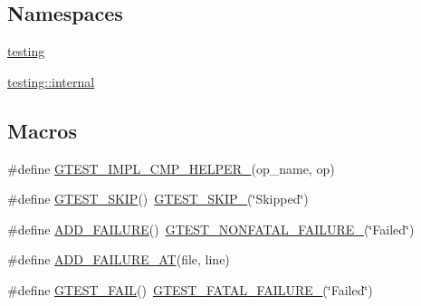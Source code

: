 \subsection*{Namespaces}
\begin{DoxyCompactItemize}
\item 
 \mbox{\hyperlink{namespacetesting}{testing}}
\item 
 \mbox{\hyperlink{namespacetesting_1_1internal}{testing\+::internal}}
\end{DoxyCompactItemize}
\subsection*{Macros}
\begin{DoxyCompactItemize}
\item 
\#define \mbox{\hyperlink{_obj__test_2lib_2googletest-master_2googletest_2include_2gtest_2gtest_8h_a4a5b6fbde5dd05e05dd6846ac5e5c18e}{G\+T\+E\+S\+T\+\_\+\+I\+M\+P\+L\+\_\+\+C\+M\+P\+\_\+\+H\+E\+L\+P\+E\+R\+\_\+}}(op\+\_\+name,  op)
\item 
\#define \mbox{\hyperlink{_obj__test_2lib_2googletest-master_2googletest_2include_2gtest_2gtest_8h_a3c0bbb980d533108ecc23c3534527d3c}{G\+T\+E\+S\+T\+\_\+\+S\+K\+IP}}()~\mbox{\hyperlink{_obj__test_2lib_2googletest-master_2googletest_2include_2gtest_2internal_2gtest-internal_8h_ab75ed7a6cd9e466944ce680c1c07ab47}{G\+T\+E\+S\+T\+\_\+\+S\+K\+I\+P\+\_\+}}(\char`\"{}Skipped\char`\"{})
\item 
\#define \mbox{\hyperlink{_obj__test_2lib_2googletest-master_2googletest_2include_2gtest_2gtest_8h_adc16b5b0a740c39084ea5c9e960e3063}{A\+D\+D\+\_\+\+F\+A\+I\+L\+U\+RE}}()~\mbox{\hyperlink{_obj__test_2lib_2googletest-release-1_88_81_2googletest_2include_2gtest_2internal_2gtest-internal_8h_a6cb7482cfa03661a91c698eb5895f642}{G\+T\+E\+S\+T\+\_\+\+N\+O\+N\+F\+A\+T\+A\+L\+\_\+\+F\+A\+I\+L\+U\+R\+E\+\_\+}}(\char`\"{}Failed\char`\"{})
\item 
\#define \mbox{\hyperlink{_obj__test_2lib_2googletest-master_2googletest_2include_2gtest_2gtest_8h_a448d7e5105b640e892fd8153fbee0b7f}{A\+D\+D\+\_\+\+F\+A\+I\+L\+U\+R\+E\+\_\+\+AT}}(file,  line)
\item 
\#define \mbox{\hyperlink{_obj__test_2lib_2googletest-master_2googletest_2include_2gtest_2gtest_8h_a636231436707c30d6778f79ae96f5dc6}{G\+T\+E\+S\+T\+\_\+\+F\+A\+IL}}()~\mbox{\hyperlink{_obj__test_2lib_2googletest-release-1_88_81_2googletest_2include_2gtest_2internal_2gtest-internal_8h_a0f9a4c3ea82cc7bf4478eaffdc168358}{G\+T\+E\+S\+T\+\_\+\+F\+A\+T\+A\+L\+\_\+\+F\+A\+I\+L\+U\+R\+E\+\_\+}}(\char`\"{}Failed\char`\"{})

\end{DoxyCompactItemize}
